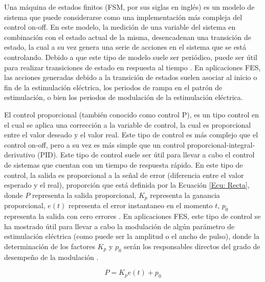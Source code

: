 Una máquina de estados finitos (FSM, por sus siglas en inglés) es un modelo de sistema que puede considerarse como una implementación más compleja del control on-off. En este modelo, la medición de una variable del sistema en combinación con el estado actual de la misma, desencadenan una transición de estado, la cual a su vez genera una serie de acciones en el sistema que se está controlando. Debido a que este tipo de modelo suele ser periódico, puede ser útil para realizar transiciones de estado en respuesta al tiempo \cite{Wright2016}. En aplicaciones FES, las acciones generadas debido a la transición de estados suelen asociar al inicio o fin de la estimulación eléctrica, los periodos de rampa en el patrón de estimulación, o bien los periodos de modulación de la estimulación eléctrica.

El control proporcional (también conocido como control P), es un tipo control en el cual se aplica una corrección a la variable de control, la cual es proporcional entre el valor deseado y el valor real. Este tipo de control es más complejo que el control on-off, pero a su vez es más simple que un control proporcional-integral-derivativo (PID). Este tipo de control suele ser útil para llevar a cabo el control de sistemas que cuentan con un tiempo de respuesta rápido. En este tipo de control, la salida es proporcional a la señal de error (diferencia entre el valor esperado y el real), proporción que está definida por la Ecuación \ref{Ecu: Recta}, donde $P$ representa la salida proporcional, $K_{p}$ representa la ganancia proporcional, $e(t)$ representa el error instantaneo en el momento $t$, $p_{0}$ representa la salida con cero errores \cite{Wayne2003}. En aplicaciones FES, este tipo de control se ha mostrado útil para llevar a cabo la modulación de algún parámetro de estimulación eléctrica (como puede ser la amplitud o el ancho de pulso), donde la determinación de los factores $K_{p}$ y $p_{0}$ serán los responsables directos del grado de desempeño de la modulación \cite{Zhou2018}.

\begin{equation}
	P = K_{p} e(t) + p_{0}
	\label{Ecu: Recta}
\end{equation}


